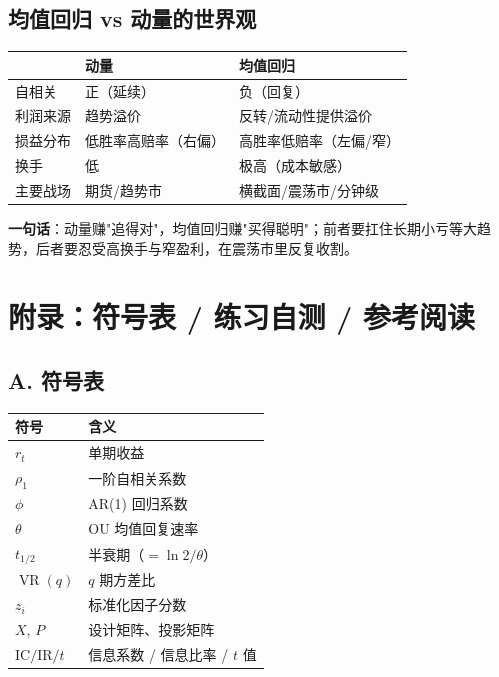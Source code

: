 \documentclass[UTF8,11pt]{ctexart}
\begin{document}
\subsection{均值回归 vs 动量的世界观}
\begin{center}
\renewcommand{\arraystretch}{1.4}
\begin{tabular}{@{}l>{\raggedright\arraybackslash}p{4.2cm}>{\raggedright\arraybackslash}p{4.2cm}@{}}
\toprule
 & \textbf{动量} & \textbf{均值回归} \\
\midrule
自相关 & 正（延续） & 负（回复） \\
利润来源 & 趋势溢价 & 反转/流动性提供溢价 \\
损益分布 & 低胜率高赔率（右偏） & 高胜率低赔率（左偏/窄） \\
换手 & 低 & 极高（成本敏感） \\
主要战场 & 期货/趋势市 & 横截面/震荡市/分钟级 \\
\bottomrule
\end{tabular}
\end{center}
\textbf{一句话}：动量赚"追得对"，均值回归赚"买得聪明"；前者要扛住长期小亏等大趋势，后者要忍受高换手与窄盈利，在震荡市里反复收割。

\section*{附录：符号表 / 练习自测 / 参考阅读}

\subsection*{A. 符号表}
\begin{center}
\renewcommand{\arraystretch}{1.4}
\begin{tabular}{@{}ll@{}}
\toprule
符号 & 含义 \\
\midrule
$r_t$ & 单期收益 \\
$\rho_1$ & 一阶自相关系数 \\
$\phi$ & AR(1) 回归系数 \\
$\theta$ & OU 均值回复速率 \\
$t_{1/2}$ & 半衰期（$=\ln2/\theta$） \\
$\operatorname{VR}(q)$ & $q$ 期方差比 \\
$z_i$ & 标准化因子分数 \\
$X,\,P$ & 设计矩阵、投影矩阵 \\
$\mathrm{IC}/\mathrm{IR}/t$ & 信息系数 / 信息比率 / $t$ 值 \\
\bottomrule
\end{tabular}
\end{center}
\end{document}
